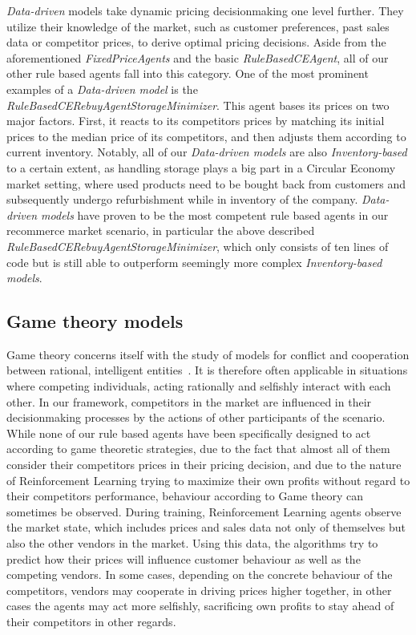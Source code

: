 \emph{Data-driven} models take dynamic pricing decisionmaking one level further. They utilize their knowledge of the market, such as customer preferences, past sales data or competitor prices, to derive optimal pricing decisions. Aside from the aforementioned \emph{FixedPriceAgents} and the basic \emph{RuleBasedCEAgent}, all of our other rule based agents fall into this category. One of the most prominent examples of a \emph{Data-driven model} is the \emph{RuleBasedCERebuyAgentStorageMinimizer}. This agent bases its prices on two major factors. First, it reacts to its competitors prices by matching its initial prices to the median price of its competitors, and then adjusts them according to current inventory. Notably, all of our \emph{Data-driven models} are also \emph{Inventory-based} to a certain extent, as handling storage plays a big part in a Circular Economy market setting, where used products need to be bought back from customers and subsequently undergo refurbishment while in inventory of the company. \emph{Data-driven models} have proven to be the most competent rule based agents in our recommerce market scenario, in particular the above described \emph{RuleBasedCERebuyAgentStorageMinimizer}, which only consists of ten lines of code but is still able to outperform seemingly more complex \emph{Inventory-based models}.

\subsection*{Game theory models}\label{subsec:GameTheory}

Game theory concerns itself with the study of models for conflict and cooperation between rational, intelligent entities~\cite{GameTheory}. It is therefore often applicable in situations where competing individuals, acting rationally and selfishly interact with each other. In our framework, competitors in the market are influenced in their decisionmaking processes by the actions of other participants of the scenario. While none of our rule based agents have been specifically designed to act according to game theoretic strategies, due to the fact that almost all of them consider their competitors prices in their pricing decision, and due to the nature of Reinforcement Learning trying to maximize their own profits without regard to their competitors performance, behaviour according to Game theory can sometimes be observed.  During training, Reinforcement Learning agents observe the market state, which includes prices and sales data not only of themselves but also the other vendors in the market. Using this data, the algorithms try to predict how their prices will influence customer behaviour as well as the competing vendors. In some cases, depending on the concrete behaviour of the competitors, vendors may cooperate in driving prices higher together, in other cases the agents may act more selfishly, sacrificing own profits to stay ahead of their competitors in other regards. 

